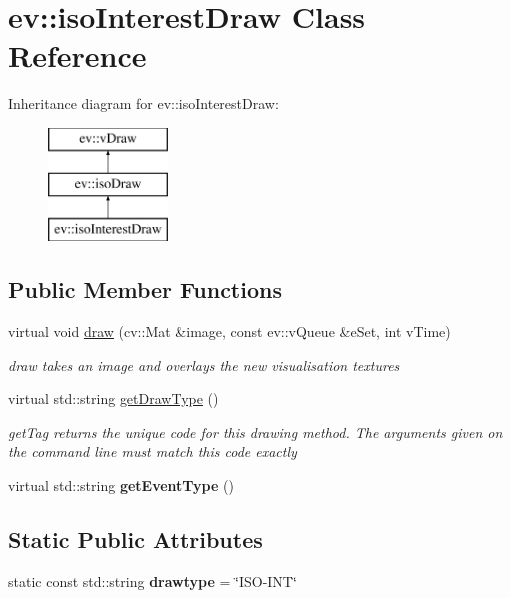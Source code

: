 \hypertarget{classev_1_1isoInterestDraw}{}\section{ev\+:\+:iso\+Interest\+Draw Class Reference}
\label{classev_1_1isoInterestDraw}
Inheritance diagram for ev\+:\+:iso\+Interest\+Draw\+:\begin{figure}[H]
\begin{center}
\leavevmode
\includegraphics[height=3.000000cm]{classev_1_1isoInterestDraw}
\end{center}
\end{figure}
\subsection*{Public Member Functions}
\begin{DoxyCompactItemize}
\item 
virtual void \hyperlink{classev_1_1isoInterestDraw_a3276f946c09d4cd0009f8379ea24d409}{draw} (cv\+::\+Mat \&image, const ev\+::v\+Queue \&e\+Set, int v\+Time)
\begin{DoxyCompactList}\small\item\em draw takes an image and overlays the new visualisation textures \end{DoxyCompactList}\item 
virtual std\+::string \hyperlink{classev_1_1isoInterestDraw_a93b2142d5652f725e21d34fedde103df}{get\+Draw\+Type} ()
\begin{DoxyCompactList}\small\item\em get\+Tag returns the unique code for this drawing method. The arguments given on the command line must match this code exactly \end{DoxyCompactList}\item 
\mbox{\label{classev_1_1isoInterestDraw_afda0762c6c3679fdd541a1df1e1fc704}} 
virtual std\+::string {\bfseries get\+Event\+Type} ()
\end{DoxyCompactItemize}
\subsection*{Static Public Attributes}
\begin{DoxyCompactItemize}
\item 
\mbox{\label{classev_1_1isoInterestDraw_ae416884ea2511db026669634be61d0ff}} 
static const std\+::string {\bfseries drawtype} = \char`\"{}I\+SO-\/I\+NT\char`\"{}
\end{DoxyCompactItemize}
